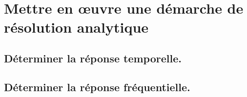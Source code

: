 \documentclass[10pt,fleqn]{book}
\newcommand{\repRel}{../..}
\newcommand{\repStyle}{\repRel/Style}
\newcommand{\td}{fichier_td}
\newcommand{\repExos}{\repRel/ExercicesCompetences}
\newcommand{\repExo}{dossier}
\begin{document}
\begin{multicols}{2}
\renewcommand{\repExo}{\repExos/C1_ProposerDemarche/C1_05_ProposerDemarcheActionMecaLoiMvt_PFS/STOCK/05_RT_02}
\renewcommand{\td}{05_RT_02}
\graphicspath{{\repStyle/png/}{\repExo/images/}}


\renewcommand{\repExo}{\repExos/C1_ProposerDemarche/C1_05_ProposerDemarcheActionMecaLoiMvt_PFS/STOCK/06_TR_02}
\renewcommand{\td}{06_TR_02}
\graphicspath{{\repStyle/png/}{\repExo/images/}}


\renewcommand{\repExo}{\repExos/C1_ProposerDemarche/C1_05_ProposerDemarcheActionMecaLoiMvt_PFS/STOCK/07_RR3D_02}
\renewcommand{\td}{07_RR3D_02}
\graphicspath{{\repStyle/png/}{\repExo/images/}}


\renewcommand{\repExo}{\repExos/C1_ProposerDemarche/C1_05_ProposerDemarcheActionMecaLoiMvt_PFS/STOCK/08_RR3D_02}
\renewcommand{\td}{08_RR3D_02}
\graphicspath{{\repStyle/png/}{\repExo/images/}}


\renewcommand{\repExo}{\repExos/C1_ProposerDemarche/C1_05_ProposerDemarcheActionMecaLoiMvt_PFS/STOCK/09_RT_RSG}
\renewcommand{\td}{09_RT_RSG}
\graphicspath{{\repStyle/png/}{\repExo/images/}}


\end{multicols}

\section{Mettre en œuvre une démarche de résolution analytique} 

\subsection{Déterminer la réponse temporelle.} 

\begin{multicols}{2} 

\end{multicols}

\subsection{Déterminer la réponse fréquentielle. } 

\begin{multicols}{2} 

\renewcommand{\repExo}{\repExos/C2_MettreEnOeuvreDemarche/C2_02_DiagrammeBode/510_Divers}
\renewcommand{\td}{510_Divers}
\graphicspath{{\repStyle/png/}{\repExo/images/}}


\renewcommand{\repExo}{\repExos/C2_MettreEnOeuvreDemarche/C2_02_DiagrammeBode/511_Divers}
\renewcommand{\td}{511_Divers}
\graphicspath{{\repStyle/png/}{\repExo/images/}}


\end{multicols}
\end{document}
